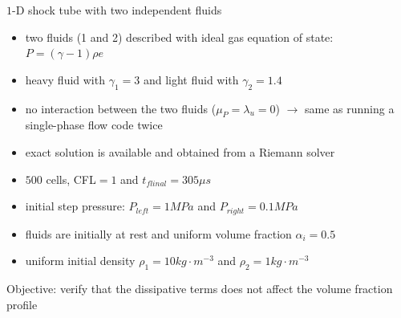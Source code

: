 \documentclass[xcolor=dvipsnames,10pt]{beamer}
\begin{document}
\begin{frame}{$1$-D shock tube with two independent fluids}
\begin{block}{}
\begin{itemize}
\setlength{\itemsep}{5pt}
\item two fluids (1 and 2) described with ideal gas equation of state: $P = (\gamma-1) \rho e$
\item heavy fluid with $\gamma_1=3$ and light fluid with $\gamma_2 =1.4$
\item no interaction between the two fluids ($\mu_P=\lambda_u=0$) $\longrightarrow$ same as running a single-phase flow code twice
\item exact solution is available and obtained from a Riemann solver
\item $500$ cells, CFL$=1$ and $t_{flinal} = 305 \mu s$ 
\item initial step pressure: $P_{left} = 1 MPa$ and $P_{right} = 0.1 MPa$
\item fluids are initially at rest and uniform volume fraction $\alpha_i = 0.5$
\item uniform initial density $\rho_1 = 10 kg \cdot m^{-3}$ and $\rho_2 = 1 kg \cdot m^{-3}$
\end{itemize}
\end{block}
Objective: verify that the dissipative terms does not affect the volume fraction profile
\end{frame}
\end{document}
